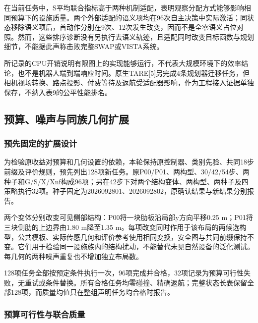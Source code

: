\documentclass[11pt,a4paper]{article}
\numberwithin{equation}{section}
\begin{document}
在当前任务中，S平均联合指标高于两种机制适配，表明观察分配方式能够影响相同预算下的设施质量。两个外部适配的语义项均在96次自主决策中实际激活；同状态移除语义项后，首动作分别在9次、12次发生改变，因而不是全零语义占位对照。然而，这些排序诊断没有另执行去语义轨迹，且适配同时改变目标函数与规划细节，不能据此声称击败完整SWAP或VISTA系统。

所记录的CPU开销说明有限图上的实现能够运行，不代表大规模环境下的效率结论，也不是机器人端到端响应时间。原生TARE{[}5{]}另完成4条规划器迁移任务，但相机视场转换、路点投影、付费等待及返航受适配器影响，作为工程接入证据单独保存，不纳入表9的公平性能排名。

\hypertarget{ux9884ux7b97ux566aux58f0ux4e0eux540cux65cfux51e0ux4f55ux6269ux5c55}{%
\subsection{预算、噪声与同族几何扩展}\label{ux9884ux7b97ux566aux58f0ux4e0eux540cux65cfux51e0ux4f55ux6269ux5c55}}

\hypertarget{ux9884ux5148ux56faux5b9aux7684ux6269ux5c55ux8bbeux8ba1}{%
\subsubsection{预先固定的扩展设计}\label{ux9884ux5148ux56faux5b9aux7684ux6269ux5c55ux8bbeux8ba1}}

为检验原收益对预算和几何设置的依赖，本轮保持原控制器、类别先验、共同18步前缀及评价规则，预先列出128项新任务。原P00/P01、两构型、30/42/54步、两种子和G/S/X/Xnf构成96项；另在42步下对两个结构变体、两构型、两种子及四策略执行32项。种子固定为2026092801、2026092802，原确认结果与新结果分别报告。

两个变体分别改变可见侧部结构：P00将一块肋板沿局部y方向平移0.25 m；P01将三块侧肋的上边界由1.80 m降至1.35 m。每项改变同时作用于该布局的两候选构型，公共模板、实际传感几何和评价参考使用相同变换，安全图与共同前缀保持不变。它们用于检验同一设施族内的结构扰动，不能替代未见自然设备的泛化测试。每几何的两种噪声重复也不增加独立布局数。

128项任务全部按预定条件执行一次，96项完成并合格，32项记录为预算可行性失败，无重试或条件替换。所有合格任务均零碰撞、精确返航；完整状态长表保留全部128项，而质量均值只在整组声明任务均合格时报告。

\hypertarget{ux9884ux7b97ux53efux884cux6027ux4e0eux8054ux5408ux8d28ux91cf}{%
\subsubsection{预算可行性与联合质量}\label{ux9884ux7b97ux53efux884cux6027ux4e0eux8054ux5408ux8d28ux91cf}}
\end{document}
